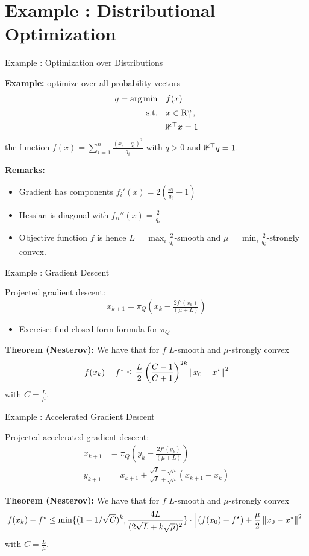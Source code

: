 \documentclass[9pt]{beamer}
\begin{document}
\section{Example : Distributional Optimization}

\begin{frame}{Example : Optimization over Distributions}

  \textbf{Example:} optimize over all probability vectors
  \[
    \begin{array}{rl}
      q= \arg\min & f(x) \\[0.5em]
      \mathrm{s.t.} & x \in \mathrm{R}_+^n, \\[0.5em]
           & \mathbb 1^\top x = 1
    \end{array}
  \]
  the function
  \(
    f(x) = \sum_{i=1}^n \tfrac{(x_i-q_i)^2}{q_i}
  \)
  with $q> 0$ and $\mathbb 1^\top q = 1$.

  \vfill

  \textbf{Remarks:}
  \begin{itemize}
  \item Gradient has components
    \(
      f_i'(x) = 2 (\tfrac{x_i}{q_i}-1)
    \)
  \item Hessian is diagonal with
    \(
      f_{ii}''(x) = \tfrac{2}{q_i}
    \)
  \item Objective function $f$ is hence $L=\max_{i}\tfrac{2}{q_i}$-smooth and $\mu=\min_i\tfrac{2}{q_i}$-strongly convex.
  \end{itemize}
\end{frame}

\begin{frame}{Example : Gradient Descent}

  Projected gradient descent:
  \[
    x_{k+1} = \pi_Q(x_k - \tfrac{2 f'(x_k)}{(\mu+L)} )
  \]
  \begin{itemize}
  \item Exercise: find closed form formula for $\pi_Q$
  \end{itemize}
  
  \vfill

  \textbf{Theorem  (Nesterov):} We have that for $f$ $L$-smooth and $\mu$-strongly convex
  \[
    f(x_k) - f^\star \leq \frac L2 \left(\frac{C-1}{C+1}\right)^{2k} \left\|x_0-x^\star\right\|^2
  \]
  with $C=\tfrac L\mu$.
\end{frame}

\begin{frame}{Example : Accelerated Gradient Descent}

  Projected accelerated gradient descent:
  \begin{align*}
    x_{k+1} & = \pi_Q(y_k - \tfrac{2 f'(y_k)}{(\mu+L)} )\\[0.5em]
    y_{k+1} & = x_{k+1} + \frac{\sqrt{L}-\sqrt{\mu}}{\sqrt{L}+\sqrt{\mu}} (x_{k+1}-x_k)
  \end{align*}

  
  \vfill

  \textbf{Theorem  (Nesterov):} We have that for $f$ $L$-smooth and $\mu$-strongly convex
  \[
    f(x_k) - f^\star \leq \min\{ (1-{1}/{\sqrt{C}})^k, \frac{4L}{(2\sqrt{L}+k\sqrt{\mu})^2} \} \cdot\left[(f(x_0)-f^\star)+ \frac\mu 2 \left\|x_0-x^\star\right\|^2\right]
  \]
  with $C=\tfrac L\mu$.
\end{frame}
\end{document}
